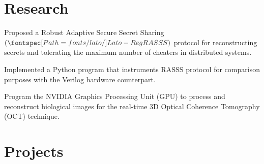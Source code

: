 \documentclass[]{deedy_format_Hien}
\begin{document}
\begin{minipage}[t]{0.66\textwidth}

\section{Research}
\vspace{-0.5mm} %
\vspace{\topsep} %
\justify
\begin{tightemize}
\item Proposed a Robust Adaptive Secure Secret Sharing $(\custombold{RASSS})$ protocol for reconstructing secrets and tolerating the maximum number of cheaters in distributed systems. 
\item Implemented a Python program that instruments RASSS protocol for comparison purposes with the Verilog hardware counterpart. 
\end{tightemize}
\vspace{\topsep}
\sectionsep

\vspace{-0.5mm} %
\vspace{\topsep} %
\justify
\begin{tightemize}
\item Program the NVIDIA Graphics Processing Unit (GPU) to process and reconstruct biological images for the real-time 3D Optical Coherence Tomography (OCT) technique. 
\end{tightemize}
\vspace{\topsep}
\sectionsep


\section{Projects}
\vspace{0.5mm} %



\end{minipage}
\end{document}
